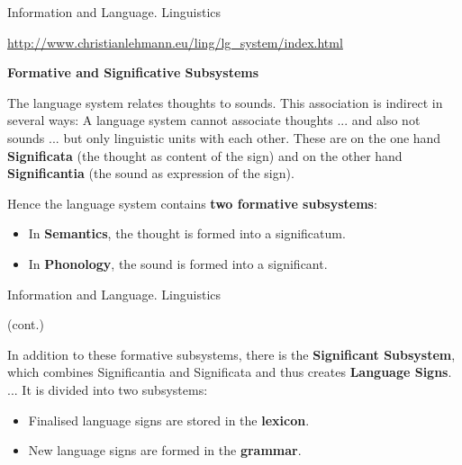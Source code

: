 \documentclass{beamer}
\newcommand{\ueberschrift}[1]{\begin{center}\bf #1\end{center}}
\begin{document}
\begin{frame}{Information and Language. Linguistics}\small
  
\url{http://www.christianlehmann.eu/ling/lg_system/index.html}

\ueberschrift{Formative and Significative Subsystems}

The language system relates thoughts to sounds. This association is indirect
in several ways: A language system cannot associate thoughts ... and also not
sounds ... but only linguistic units with each other. These are on the one
hand \textbf{Significata} (the thought as content of the sign) and on the
other hand \textbf{Significantia} (the sound as expression of the sign).

Hence the language system contains \textbf{two formative subsystems}:
\begin{itemize}
\item In \textbf{Semantics}, the thought is formed into a significatum.
\item In \textbf{Phonology}, the sound is formed into a significant.
\end{itemize}
\end{frame}
\begin{frame}{Information and Language. Linguistics}\small
  
  (cont.)
  
In addition to these formative subsystems, there is the \textbf{Significant
  Subsystem}, which combines Significantia and Significata and thus creates
\textbf{Language Signs}. ... It is divided into two subsystems:
\begin{itemize}
\item Finalised language signs are stored in the \textbf{lexicon}.
\item New language signs are formed in the \textbf{grammar}.
\end{itemize}
\end{frame}
\end{document}
